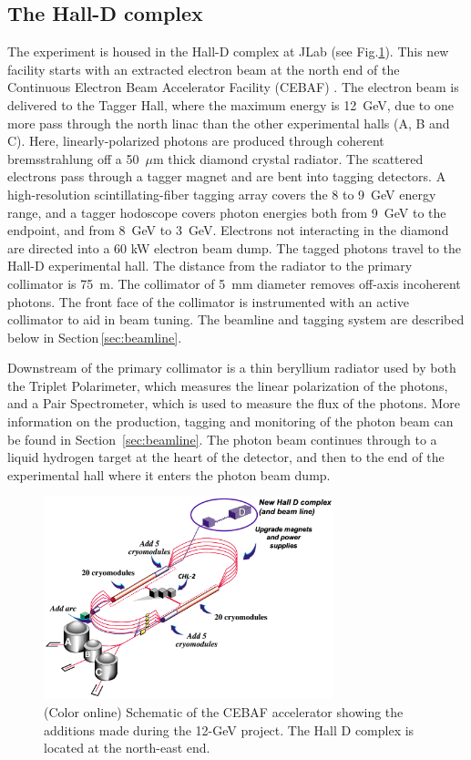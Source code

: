 \subsection[The Hall-D complex]{The Hall-D complex \label{sec:gluexexperiment:complex}}
The \gx{} experiment is housed in the Hall-D complex at JLab (see Fig.\ref{fig:CEBAF-graphic}). This new facility starts with an extracted electron beam at the north end of the Continuous Electron Beam Accelerator Facility (CEBAF) \cite{Leemann:2001dg}. The electron beam is delivered to the Tagger Hall, where the maximum energy is 12~GeV, due to one more pass through the north linac than the other experimental halls (A, B and C).  Here, linearly-polarized photons are produced through coherent bremsstrahlung off a 50~$\mu$m thick diamond crystal radiator.
The scattered electrons pass through a tagger magnet and are bent into tagging detectors. A high-resolution scintillating-fiber tagging array covers the 8 to 9~GeV energy range, and a tagger hodoscope covers photon energies both from 9~GeV to the endpoint, and from 8~GeV to 3~GeV. Electrons not interacting in the diamond are directed into a 60 kW electron beam dump. The tagged photons travel to the Hall-D experimental hall. The distance from the radiator to the primary collimator is 75~m. The collimator of 5~mm diameter removes off-axis incoherent photons. The front face of the collimator is instrumented with an active collimator to aid in beam tuning.  The beamline and tagging system are described below in Section\,\ref{sec:beamline}.

Downstream of the primary collimator is a thin beryllium radiator used by both the Triplet Polarimeter, which measures the linear polarization of the photons, and a Pair Spectrometer, which is used to measure the flux of the photons. More information on the production, tagging and monitoring of the photon beam can be found in Section~\ref{sec:beamline}. 
The photon beam continues through to a liquid hydrogen target at the heart of the \gx{} detector, and then to the end of the experimental hall where it enters the photon beam dump.

\begin{figure}[tbp]\centering
\includegraphics[width=0.75\textwidth]{figures/CEBAF-graphic.png}
\caption[]{\label{fig:CEBAF-graphic}(Color online) Schematic of the CEBAF accelerator showing the additions made during the 12-GeV project. The Hall D complex is located at the north-east end.}
\end{figure}

